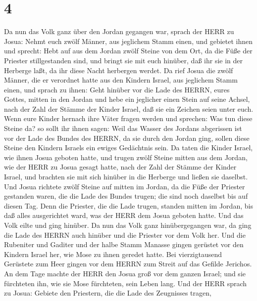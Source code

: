 \hypertarget{section-3}{%
\section{4}\label{section-3}}

 Da nun das Volk ganz über den Jordan gegangen war, sprach
der HERR zu Josua:  Nehmt euch zwölf Männer, aus jeglichem
Stamm einen,  und gebietet ihnen und sprecht: Hebt auf aus
dem Jordan zwölf Steine von dem Ort, da die Füße der Priester
stillgestanden sind, und bringt sie mit euch hinüber, daß ihr sie in der
Herberge laßt, da ihr diese Nacht herbergen werdet.  Da rief
Josua die zwölf Männer, die er verordnet hatte aus den Kindern Israel,
aus jeglichem Stamm einen,  und sprach zu ihnen: Geht
hinüber vor die Lade des HERRN, eures Gottes, mitten in den Jordan und
hebe ein jeglicher einen Stein auf seine Achsel, nach der Zahl der
Stämme der Kinder Israel,  daß sie ein Zeichen seien unter
euch. Wenn eure Kinder hernach ihre Väter fragen werden und sprechen:
Was tun diese Steine da?  so sollt ihr ihnen sagen: Weil das
Wasser des Jordans abgerissen ist vor der Lade des Bundes des HERRN, da
sie durch den Jordan ging, sollen diese Steine den Kindern Israels ein
ewiges Gedächtnis sein.  Da taten die Kinder Israel, wie
ihnen Josua geboten hatte, und trugen zwölf Steine mitten aus dem
Jordan, wie der HERR zu Josua gesagt hatte, nach der Zahl der Stämme der
Kinder Israel, und brachten sie mit sich hinüber in die Herberge und
ließen sie daselbst.  Und Josua richtete zwölf Steine auf
mitten im Jordan, da die Füße der Priester gestanden waren, die die Lade
des Bundes trugen; die sind noch daselbst bis auf diesen Tag.
 Denn die Priester, die die Lade trugen, standen mitten im
Jordan, bis daß alles ausgerichtet ward, was der HERR dem Josua geboten
hatte. Und das Volk eilte und ging hinüber.  Da nun das
Volk ganz hinübergegangen war, da ging die Lade des HERRN auch hinüber
und die Priester vor dem Volk her.  Und die Rubeniter und
Gaditer und der halbe Stamm Manasse gingen gerüstet vor den Kindern
Israel her, wie Mose zu ihnen geredet hatte.  Bei
vierzigtausend Gerüstete zum Heer gingen vor dem HERRN zum Streit auf
das Gefilde Jerichos.  An dem Tage machte der HERR den
Josua groß vor dem ganzen Israel; und sie fürchteten ihn, wie sie Mose
fürchteten, sein Leben lang.  Und der HERR sprach zu Josua:
 Gebiete den Priestern, die die Lade des Zeugnisses tragen,
